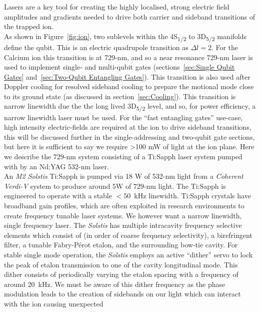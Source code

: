    Lasers are a key tool for creating the highly localised, strong electric
    field amplitudes and gradients needed to drive both carrier and sideband
    transitions of the trapped ion.\\ As shown in Figure~\ref{fig:ion}, 
    two sublevels within the 4S\textsubscript{1/2} to 3D\textsubscript{5/2}
    manifolds define the qubit. This is an electric quadrupole transition as
    $\Delta l = 2$.  For the Calcium ion this transition is at 729-nm, and so 
    a near resonance 729-nm laser is used to implement single- and multi-qubit gates
    (sections~\ref{sec:Single Qubit Gates} and~\ref{sec:Two-Qubit
    Entangling Gates}). This transition is also used after Doppler cooling for
    resolved sideband cooling to prepare the motional mode close to its ground
    state (as discussed in section~\ref{sec:Cooling}).
    This transition is narrow linewidth due the the long lived
    3D\textsubscript{5/2} level, and so, for power efficiency, a
    narrow linewidth laser must be used. For the ``fast entangling gates'' use-case, high intensity electric-fields are required at the ion to drive sideband
    transitions, this will be discussed further in the single-addressing and
    two-qubit gate sections, but here it is sufficient to say we require >100 mW
    of light at the ion plane.  Here we describe the 729-nm system 
    consisting of a Ti:Sapph laser system pumped with by an Nd:YAG 532-nm laser.\\
    An \emph{M2 Solstis} Ti:Sapph is pumped via 18 W of 532-nm light
    from a \emph{Coherent Verdi-V} system to produce around 5W of
    729-nm light.  The Ti:Sapph is engineered to operate with a stable $<50$~kHz
    linewidth. Ti:Sapph crystals have broadband gain profiles, which
    are often exploited in research environments to create frequency tunable
    laser systems. We however want a narrow linewidth, single frequency laser.
    The \emph{Solstis} has multiple intracavity frequency selective
    elements which consist of (in order of coarse frequency selectivity), a
    birefringent filter, a tunable Fabry-P\'erot etalon, and the surrounding
    bow-tie cavity. For stable single mode operation, the \emph{Solstis} employs
    an active ``dither'' servo to lock the peak of etalon transmission to one of
    the cavity longitudinal mode. This dither consists of periodically varying
    the etalon spacing with a frequency of around 20~kHz. We must be aware of
    this dither frequency as the phase modulation leads to the creation of
    sidebands on our light which can interact with the ion causing unexpected
